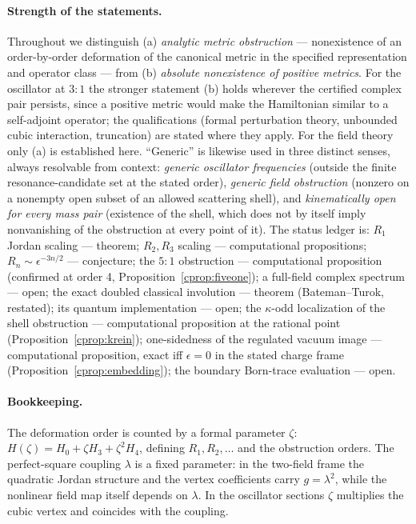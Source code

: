 \documentclass[11pt]{article}
\theoremstyle{definition}
\theoremstyle{remark}
\begin{document}
\paragraph{Strength of the statements.}
Throughout we distinguish (a) \emph{analytic metric obstruction} ---
nonexistence of an order-by-order deformation of the canonical metric
in the specified representation and operator class --- from (b)
\emph{absolute nonexistence of positive metrics}.  For the oscillator
at $3{:}1$ the stronger statement (b) holds wherever the certified
complex pair persists, since a positive metric would make the
Hamiltonian similar to a self-adjoint operator; the qualifications
(formal perturbation theory, unbounded cubic interaction, truncation)
are stated where they apply.  For the field theory only (a) is
established here.  ``Generic'' is likewise used in three distinct
senses, always resolvable from context: \emph{generic oscillator
frequencies} (outside the finite resonance-candidate set at the stated
order), \emph{generic field obstruction} (nonzero on a nonempty open
subset of an allowed scattering shell), and \emph{kinematically open
for every mass pair} (existence of the shell, which does not by itself
imply nonvanishing of the obstruction at every point of it).  The
status ledger is: $R_1$ Jordan scaling --- theorem; $R_2,R_3$ scaling
--- computational propositions; $R_n\sim\epsilon^{-3n/2}$ ---
conjecture; the $5{:}1$ obstruction --- computational proposition
(confirmed at order 4, Proposition~\ref{cprop:fiveone}); a full-field
complex spectrum --- open; the exact doubled classical involution ---
theorem (Bateman--Turok, restated); its quantum implementation ---
open; the $\kappa$-odd localization of the shell obstruction ---
computational proposition at the rational point
(Proposition~\ref{cprop:krein}); one-sidedness of the regulated vacuum
image --- computational proposition, exact iff $\epsilon=0$ in the
stated charge frame (Proposition~\ref{cprop:embedding}); the boundary
Born-trace evaluation --- open.

\paragraph{Bookkeeping.}
The deformation order is counted by a formal parameter $\zeta$:
$H(\zeta)=H_0+\zeta H_3+\zeta^2H_4$, defining $R_1,R_2,\dots$ and the
obstruction orders.  The perfect-square coupling $\lambda$ is a fixed
parameter: in the two-field frame the quadratic Jordan structure and
the vertex coefficients carry $g=\lambda^2$, while the nonlinear field
map itself depends on $\lambda$.  In the oscillator sections $\zeta$
multiplies the cubic vertex and coincides with the coupling.
\end{document}
